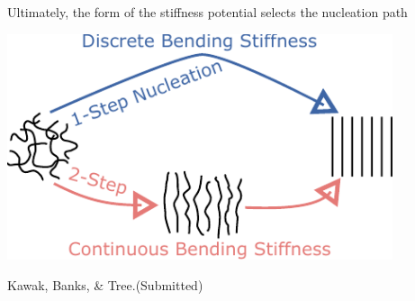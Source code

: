 \documentclass[aspectratio=169]{beamer}
\begin{document}
\begin{frame}[c]{Ultimately, the form of the stiffness potential selects the nucleation path}

  \centering
  \vspace{0.5\baselineskip}

  \includegraphics[width=0.85\textwidth]{../figures/fig-Letter_ToC/fig-ToC.pdf}

  {\small{}Kawak, Banks, \& Tree.(Submitted)\par}
\end{frame}
\end{document}
